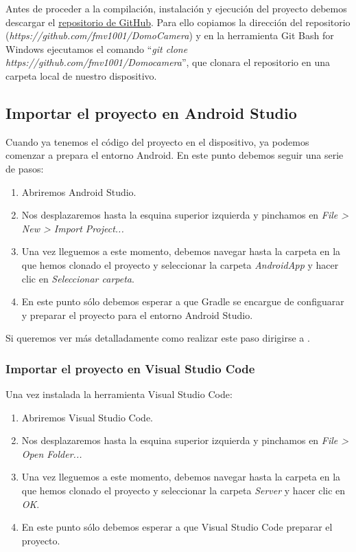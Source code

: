 Antes de proceder a la compilación, instalación y ejecución del proyecto debemos descargar el \href{https://github.com/fmv1001/LocalStream}{repositorio de GitHub}.
Para ello copiamos la dirección del repositorio (\textit{https://github.com/fmv1001/DomoCamera}) y en la herramienta Git Bash for Windows ejecutamos el comando ``\textit{git clone https://github.com/fmv1001/Domocamera}'', que clonara el repositorio en una carpeta local de nuestro dispositivo.

\subsection{Importar el proyecto en Android Studio}

Cuando ya tenemos el código del proyecto en el dispositivo, ya podemos comenzar a prepara el entorno Android. En este punto debemos seguir una serie de pasos:
\begin{enumerate}
\item
	Abriremos Android Studio.
\item
	Nos desplazaremos hasta la esquina superior izquierda y pinchamos en \textit{File > New > Import Project...}
\item
	Una vez lleguemos a este momento, debemos navegar hasta la carpeta en la que hemos clonado el proyecto y seleccionar la carpeta \textit{AndroidApp} y hacer clic en \textit{Seleccionar carpeta}.
\item
	En este punto sólo debemos esperar a que Gradle se encargue de configuarar y preparar el proyecto para el entorno Android Studio.
\end{enumerate}

Si queremos ver más detalladamente como realizar este paso dirigirse a \cite{importAS}.

\subsubsection{Importar el proyecto en Visual Studio Code}\label{importtovsc}

Una vez instalada la herramienta Visual Studio Code:

\begin{enumerate}
\item
	Abriremos Visual Studio Code.
\item
	Nos desplazaremos hasta la esquina superior izquierda y pinchamos en \textit{File > Open Folder...}
\item
	Una vez lleguemos a este momento, debemos navegar hasta la carpeta en la que hemos clonado el proyecto y seleccionar la carpeta \textit{Server} y hacer clic en \textit{OK}.
\item
	En este punto sólo debemos esperar a que Visual Studio Code preparar el proyecto.
\end{enumerate}

